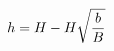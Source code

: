 \documentclass[preview]{standalone}
\begin{document}
\begin{align*}
\special{dvisvgm:raw <g id='unique000'>}h=H-H\sqrt{\frac{b}{B}}\special{dvisvgm:raw </g>}
\end{align*}
\end{document}
